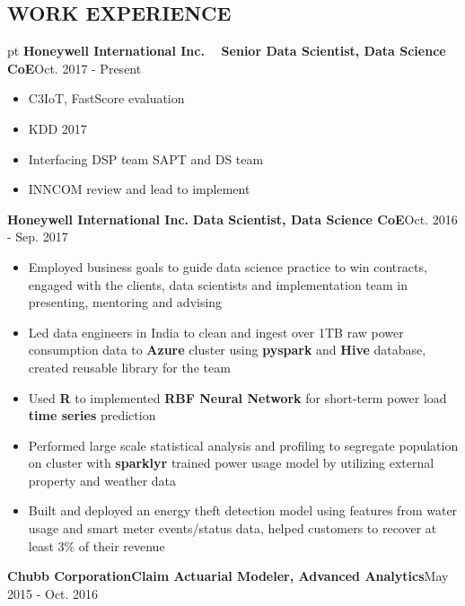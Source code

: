 \documentclass[10.5pt]{res} %
\begin{document}
\begin{resume}
\section{WORK EXPERIENCE}  pt
	\textbf{Honeywell International Inc.} ~~\textbf{Senior Data Scientist, Data Science CoE}\hfill Oct. 2017 - Present
		\begin{itemize}
			\item C3IoT, FastScore evaluation
			\item KDD 2017
			\item Interfacing DSP team SAPT and DS team
			\item INNCOM review and lead to implement
		\end{itemize}\vspace{-\topsep}
	\textbf{Honeywell International Inc.} \quad\quad\textbf{Data Scientist, Data Science CoE}\hfill Oct. 2016 - Sep. 2017
		\begin{itemize}
			\item Employed business goals to guide data science practice to win contracts, engaged with the clients, data scientists and implementation team in presenting, mentoring and advising 
			\item Led data engineers in India to clean and ingest over 1TB raw power consumption data to \textbf{Azure} cluster using \textbf{pyspark} and \textbf{Hive} database, created reusable library for the team
			\item Used \textbf{R} to implemented \textbf{RBF Neural Network}  for short-term power load \textbf{time series} prediction     
			\item Performed large scale statistical analysis and profiling to segregate population on cluster with \textbf{sparklyr} trained power usage model by utilizing external property and weather data
			\item Built and deployed an energy theft detection model using features from water usage and smart meter events/status data, helped customers to recover at least 3\% of their revenue  
		\end{itemize}\vspace{-\topsep}
	\textbf{Chubb Corporation}\quad \textbf{Claim Actuarial Modeler, Advanced Analytics}\hfill May 2015 - Oct. 2016

\end{resume}
\end{document}

